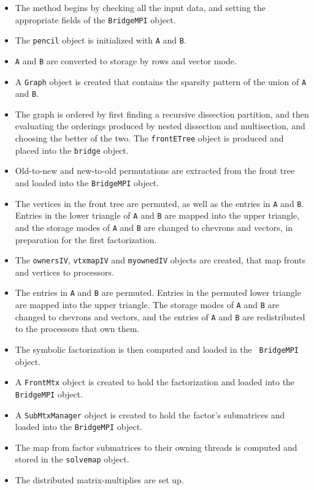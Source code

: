 \begin{enumerate}
\begin{itemize}
\item
The method begins by checking all the input data,
and setting the appropriate fields of the {\tt BridgeMPI} object.
\item
The {\tt pencil} object is initialized with {\tt A} and {\tt B}.
\item
{\tt A} and {\tt B} are converted to storage by rows and vector mode.
\item
A {\tt Graph} object is created that contains the sparsity pattern of
the union of {\tt A} and {\tt B}.
\item
The graph is ordered by first finding a recursive dissection partition,
and then evaluating the orderings produced by nested dissection and
multisection, and choosing the better of the two.
The {\tt frontETree} object is produced and placed into the {\tt bridge}
object.
\item
Old-to-new and new-to-old permutations are extracted from the front tree
and loaded into the {\tt BridgeMPI} object.
\item
The vertices in the front tree are permuted, as well as the entries in 
{\tt A} and {\tt B}.
Entries in the lower triangle of {\tt A} and {\tt B} are mapped into the
upper triangle, and the storage modes of {\tt A} and {\tt B} are changed
to chevrons and vectors, in preparation for the first factorization.
\item
The {\tt ownersIV}, {\tt vtxmapIV} and {\tt myownedIV} objects are
created, that map fronts and vertices to processors.
\item
The entries in {\tt A} and {\tt B} are permuted.
Entries in the permuted lower triangle are mapped into the upper
triangle.
The storage modes of {\tt A} and {\tt B} are changed
to chevrons and vectors,
and the entries of {\tt A} and {\tt B} are redistributed to the
processors that own them.
\item
The symbolic factorization is then computed and loaded in the {\tt
BridgeMPI} object.
\item
A {\tt FrontMtx} object is created to hold the factorization
and loaded into the {\tt BridgeMPI} object.
\item
A {\tt SubMtxManager} object is created to hold the factor's
submatrices and loaded into the {\tt BridgeMPI} object.
\item
The map from factor submatrices to their owning threads 
is computed and stored in the {\tt solvemap} object.
\item
The distributed matrix-multiplies are set up.

\end{itemize}
\end{enumerate}
